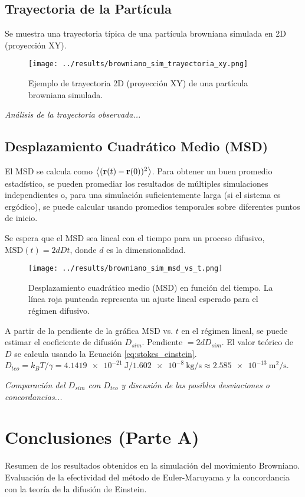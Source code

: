 \documentclass[11pt,a4paper]{article}
\begin{document}
\subsection{Trayectoria de la Partícula}
Se muestra una trayectoria típica de una partícula browniana simulada en 2D (proyección XY).
\begin{figure}[h!]
    \centering
    \texttt{[image: ../results/browniano\_sim\_trayectoria\_xy.png]} %
    \caption{Ejemplo de trayectoria 2D (proyección XY) de una partícula browniana simulada.}
    \label{fig:trayectoria_informe}
\end{figure}
\textit{Análisis de la trayectoria observada...}

\subsection{Desplazamiento Cuadrático Medio (MSD)}
El MSD se calcula como $\expval{(\vb{r}(t) - \vb{r}(0))^2}$. Para obtener un buen promedio estadístico, se pueden promediar los resultados de múltiples simulaciones independientes o, para una simulación suficientemente larga (si el sistema es ergódico), se puede calcular usando promedios temporales sobre diferentes puntos de inicio.

Se espera que el MSD sea lineal con el tiempo para un proceso difusivo, $\text{MSD}(t) = 2dDt$, donde $d$ es la dimensionalidad.
\begin{figure}[h!]
    \centering
    \texttt{[image: ../results/browniano\_sim\_msd\_vs\_t.png]} %
    \caption{Desplazamiento cuadrático medio (MSD) en función del tiempo. La línea roja punteada representa un ajuste lineal esperado para el régimen difusivo.}
    \label{fig:msd_informe}
\end{figure}
A partir de la pendiente de la gráfica MSD vs. $t$ en el régimen lineal, se puede estimar el coeficiente de difusión $D_{sim}$.
Pendiente $= 2dD_{sim}$.
El valor teórico de $D$ se calcula usando la Ecuación \ref{eq:stokes_einstein}.
$D_{teo} = k_B T / \gamma = \SI{4.1419e-21}{\joule} / \SI{1.602e-8}{\kilo\gram\per\second} \approx \SI{2.585e-13}{\meter\squared\per\second}$.

\textit{Comparación del $D_{sim}$ con $D_{teo}$ y discusión de las posibles desviaciones o concordancias...}

\section{Conclusiones (Parte A)}
Resumen de los resultados obtenidos en la simulación del movimiento Browniano. Evaluación de la efectividad del método de Euler-Maruyama y la concordancia con la teoría de la difusión de Einstein.
\end{document}
